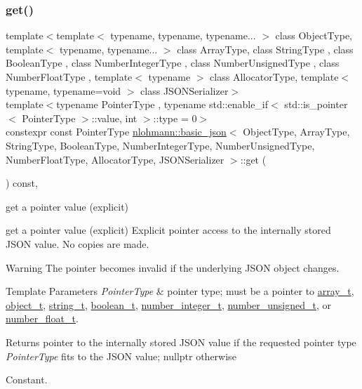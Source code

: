\subsubsection{\texorpdfstring{get()}{get()}\hspace{0.1cm}{\footnotesize\ttfamily [5/5]}}
{\footnotesize\ttfamily template$<$template$<$ typename, typename, typename... $>$ class Object\+Type, template$<$ typename, typename... $>$ class Array\+Type, class String\+Type , class Boolean\+Type , class Number\+Integer\+Type , class Number\+Unsigned\+Type , class Number\+Float\+Type , template$<$ typename $>$ class Allocator\+Type, template$<$ typename, typename=void $>$ class J\+S\+O\+N\+Serializer$>$ \\
template$<$typename Pointer\+Type , typename std\+::enable\+\_\+if$<$ std\+::is\+\_\+pointer$<$ Pointer\+Type $>$\+::value, int $>$\+::type  = 0$>$ \\
constexpr const Pointer\+Type \hyperlink{classnlohmann_1_1basic__json}{nlohmann\+::basic\+\_\+json}$<$ Object\+Type, Array\+Type, String\+Type, Boolean\+Type, Number\+Integer\+Type, Number\+Unsigned\+Type, Number\+Float\+Type, Allocator\+Type, J\+S\+O\+N\+Serializer $>$\+::get (\begin{DoxyParamCaption}{ }\end{DoxyParamCaption}) const\hspace{0.3cm}{\ttfamily [inline]}, {\ttfamily [noexcept]}}



get a pointer value (explicit) 

get a pointer value (explicit) Explicit pointer access to the internally stored J\+S\+ON value. No copies are made.

\begin{DoxyWarning}{Warning}
The pointer becomes invalid if the underlying J\+S\+ON object changes.
\end{DoxyWarning}

\begin{DoxyTemplParams}{Template Parameters}
{\em Pointer\+Type} & pointer type; must be a pointer to \hyperlink{classnlohmann_1_1basic__json_ae095578e03df97c5b3991787f1056374}{array\+\_\+t}, \hyperlink{classnlohmann_1_1basic__json_a5e48a7893520e1314bf0c9723e26ea2a}{object\+\_\+t}, \hyperlink{classnlohmann_1_1basic__json_a61f8566a1a85a424c7266fb531dca005}{string\+\_\+t}, \hyperlink{classnlohmann_1_1basic__json_a4c919102a9b4fe0d588af64801436082}{boolean\+\_\+t}, \hyperlink{classnlohmann_1_1basic__json_a98e611d67b7bd75307de99c9358ab2dc}{number\+\_\+integer\+\_\+t}, \hyperlink{classnlohmann_1_1basic__json_ab906e29b5d83ac162e823ada2156b989}{number\+\_\+unsigned\+\_\+t}, or \hyperlink{classnlohmann_1_1basic__json_a88d6103cb3620410b35200ee8e313d97}{number\+\_\+float\+\_\+t}.\\
\hline
\end{DoxyTemplParams}
\begin{DoxyReturn}{Returns}
pointer to the internally stored J\+S\+ON value if the requested pointer type {\itshape Pointer\+Type} fits to the J\+S\+ON value; {\ttfamily nullptr} otherwise
\end{DoxyReturn}
Constant.

